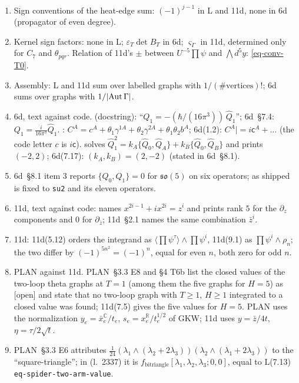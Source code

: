 \documentclass[10pt,a4paper]{article}
\numberwithin{equation}{section}
\newcommand{\bz}{\bar z}
\newcommand{\LL}[2]{\textsf{L}(#1){\scriptsize\,\texttt{#2}}}
\newcommand{\Sd}[1]{\textsf{6d}(#1)}
\newcommand{\Ed}[1]{\textsf{11d}(#1)}
\begin{document}
\begin{enumerate}
\item Sign conventions of the heat-edge sum: $(-1)^{j-1}$ in \textsf{L} and \textsf{11d}, none in \textsf{6d} (propagator of even degree).
\item Kernel sign factors: none in \textsf{L}; $\varepsilon_T\det B_T$ in \textsf{6d}; $\varsigma_\Gamma$ in \textsf{11d}, determined only for $C_7$ and $\theta_{pqr}$. Relation of \textsf{11d}'s $\pm$ between $U^{-5}\prod\psi$ and $\bigwedge d^5y$: \eqref{eq-conv-T0}.
\item Assembly: \textsf{L} and \textsf{11d} sum over labelled graphs with $1/(\#\text{vertices})!$; \textsf{6d} sums over graphs with $1/|{\rm Aut}\,\Gamma|$.
\item \textsf{6d}, text against code.  (docstring): ``$Q_1=-(\hbar/(16\pi^3))\,\hat Q_1$''; \textsf{6d}~\S7.4: $Q_1=\frac i{16\pi^3}\hat Q_1$. : $C^A=c^A+\theta_1\gamma^{1A}+\theta_2\gamma^{2A}+\theta_1\theta_2b^A$; \Sd{1.2}: $C^A|=i\mathsf c^A+\dots$ (the code letter $c$ is $i\mathsf c$).  solves $\hat Q_1^2=k_A\{\hat Q_0,\hat Q_A\}+k_B\{\hat Q_0,\hat Q_B\}$ and prints $(-2,2)$; \Sd{7.17}: $(k_A,k_B)=(2,-2)$ (stated in \textsf{6d}~\S8.1).
\item \textsf{6d}~\S8.1 item 3 reports $\{Q_0,Q_1\}=0$ for $\mathfrak{so}(5)$ on six operators;  as shipped is fixed to \texttt{su2} and its eleven operators.
\item \textsf{11d}, text against code:  names $x^{2i-1}+ix^{2i}=z^i$ and prints rank $5$ for the $\partial_z$ components and $0$ for $\partial_{\bz}$; \textsf{11d}~\S2.1 names the same combination $\bz^i$.
\item \textsf{11d}: \Ed{5.12} orders the integrand as $\langle\prod\psi^\tau\rangle\wedge\prod\psi^i$, \Ed{9.1} as $\prod\psi^i\wedge\rho_n$; the two differ by $(-1)^{5n^2}=(-1)^n$, equal for even $n$, both zero for odd $n$.
\item \textsf{PLAN} against \textsf{11d}. \textsf{PLAN}~\S3.3 E8 and \S4 T6b list the closed values of the two-loop theta graphs at $T=1$ (among them the five graphs for $H=5$) as [open] and state that no two-loop graph with $T\ge1$, $H\ge1$ integrated to a closed value was found; \Ed{7.5} gives the five values for $H=5$. \textsf{PLAN} uses the normalization $y_e=\bar x^{\mathbb C}_e/t_e$, $s_e=x^{\mathbb R}_e/t_e^{1/2}$ of \textsf{GKW}; \textsf{11d} uses $y=\bz/4t$, $\eta=\tau/2\sqrt t$.
\item \textsf{PLAN}~\S3.3 E6 attributes $\frac1{24}(\lambda_1\wedge(\lambda_2+2\lambda_3))(\lambda_2\wedge(\lambda_1+2\lambda_3))$ to the ``square-triangle''; in  (l.~2337) it is $f_{\text{bitriangle}}[\lambda_1,\lambda_2,\lambda_3;0,0]$, equal to \LL{7.13}{eq-spider-two-arm-value}.

\end{enumerate}
\end{document}
